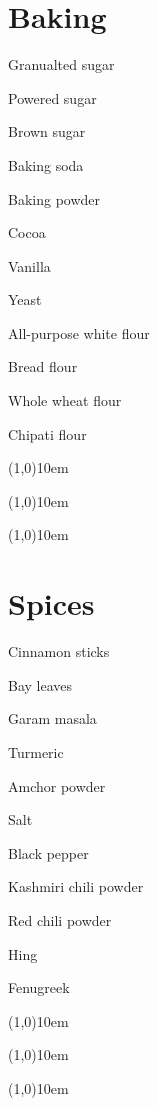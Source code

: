 \documentclass{article}
\begin{document}
   \begin{multicols}{3}
      \section*{Baking}
         \begin{shoppingList}
            \item Granualted sugar
            \item Powered sugar
            \item Brown sugar
            \item Baking soda
            \item Baking powder
            \item Cocoa
            \item Vanilla
            \item Yeast
            \item All-purpose white flour
            \item Bread flour
            \item Whole wheat flour
            \item Chipati flour
            \item \line(1,0){10em}
            \item \line(1,0){10em}
            \item \line(1,0){10em}
         \end{shoppingList}
      \section*{Spices}
         \begin{shoppingList}
            \item Cinnamon sticks
            \item Bay leaves
            \item Garam masala
            \item Turmeric
            \item Amchor powder
            \item Salt
            \item Black pepper
            \item Kashmiri chili powder
            \item Red chili powder
            \item Hing
            \item Fenugreek
            \item \line(1,0){10em}
            \item \line(1,0){10em}
            \item \line(1,0){10em}
         \end{shoppingList}

\end{multicols}
\end{document}
